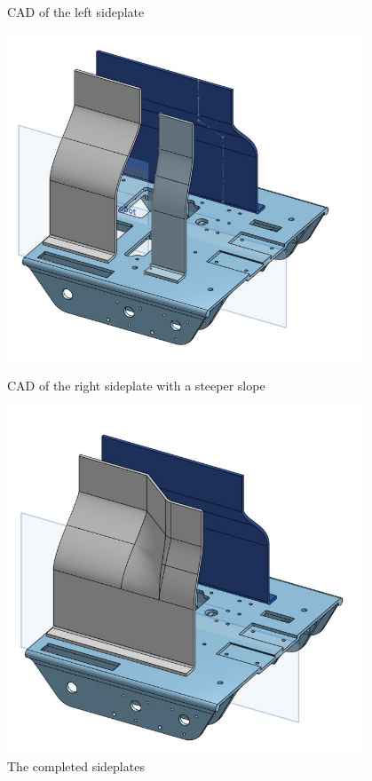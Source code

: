\begin{figure}[ht]
\begin{minipage}[b]{.48\textwidth}
  \caption{CAD of the left sideplate}
  \label{fig:pic2}
\end{minipage}
\end{figure}

\begin{figure}[ht]
\centering
\begin{minipage}[b]{.48\textwidth}
  \centering
  \includegraphics[width=0.95\textwidth]{Meetings/November/11-26-21/11-26-21_CAD_Figure5 - Nathan Forrer.JPG}
  \caption{CAD of the right sideplate with a steeper slope}
  \label{fig:pic1}
\end{minipage}%
\hfill%
\begin{minipage}[b]{.48\textwidth}
  \centering
  \includegraphics[width=0.95\textwidth]{Meetings/November/11-26-21/11-26-21_CAD_Figure6 - Nathan Forrer.JPG}
  \caption{The completed sideplates}
  \label{fig:pic2}
\end{minipage}
\end{figure}



